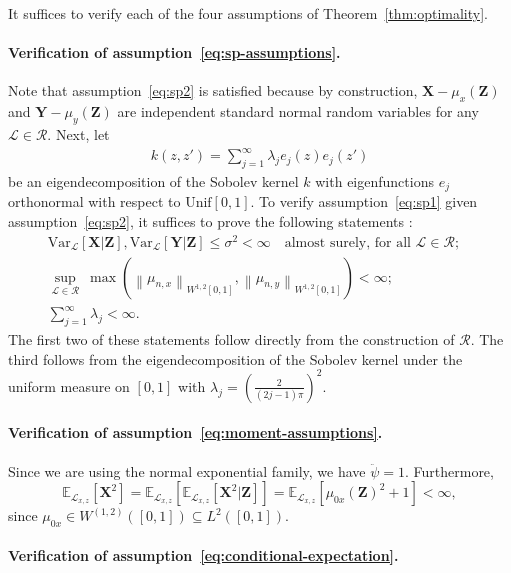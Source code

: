 \documentclass[aos]{imsart}
\theoremstyle{plain}
\theoremstyle{remark}
\newcommand{\E}{\mathbb E}								%
\newcommand{\V}{\mathrm{Var}}							%
\newcommand{\norm}[1]{\left\lVert{#1}\right\rVert}		%
\newcommand{\prx}{\bm X}								%
\newcommand{\prz}{\bm Z}								%
\newcommand{\pry}{{\bm Y}}								%
\newcommand{\law}{\mathcal L}							%
\newcommand{\regclass}{\mathscr R}					    %
\begin{document}
It suffices to verify each of the four assumptions of Theorem~\ref{thm:optimality}.

\paragraph*{Verification of assumption~\eqref{eq:sp-assumptions}.}

Note that assumption~\eqref{eq:sp2} is satisfied because by construction, $\prx - \mu_{x}(\prz)$ and $\pry - \mu_y(\prz)$ are independent standard normal random variables for any $\law \in \regclass$. Next, let 
\begin{align}\label{eq:eigen_decomp}
	k(z,z')=\sum_{j=1}^{\infty}\lambda_{j}e_{j}(z)e_{j}(z')
\end{align}
be an eigendecomposition of the Sobolev kernel $k$ with eigenfunctions $e_{j}$ orthonormal with respect to $\text{Unif}[0,1]$. To verify assumption~\eqref{eq:sp1} given assumption~\eqref{eq:sp2}, it suffices to prove the following statements \citep[Theorem 11 and Remark 12]{Shah2018}: 
\begin{align*}
\V_{\law}[\prx|\prz], \V_{\law}[\pry|\prz] \leq \sigma^2 < \infty \quad \text{almost surely, for all } \law \in \regclass;& \\
\sup_{\law \in \regclass}\ \max(\norm{\mu_{n,x}}_{W^{1,2}[0,1]}, \norm{\mu_{n,y}}_{W^{1,2}[0,1]}) < \infty;& \\
\sum_{j = 1}^\infty \lambda_{j} < \infty.&
\end{align*}
The first two of these statements follow directly from the construction of $\regclass$. The third follows from the eigendecomposition of the Sobolev kernel under the uniform measure on $[0,1]$ \citep[Example 12.23]{Wainwright2019} with $\lambda_j = (\frac{2}{(2j-1)\pi})^2$.

\paragraph*{Verification of assumption~\eqref{eq:moment-assumptions}.}

Since we are using the normal exponential family, we have $\ddot \psi = 1$. Furthermore, 
\begin{equation}
\E_{\law_{x,z}}[\prx^2] = \E_{\law_{x,z}}[\E_{\law_{x,z}}[\prx^2|\prz]] = \E_{\law_{x,z}}[\mu_{0x}(\prz)^2 + 1] < \infty,
\end{equation}
since $\mu_{0x} \in W^{(1,2)}([0,1]) \subseteq L^2([0,1])$.

\paragraph*{Verification of assumption~\eqref{eq:conditional-expectation}.}
\end{document}
